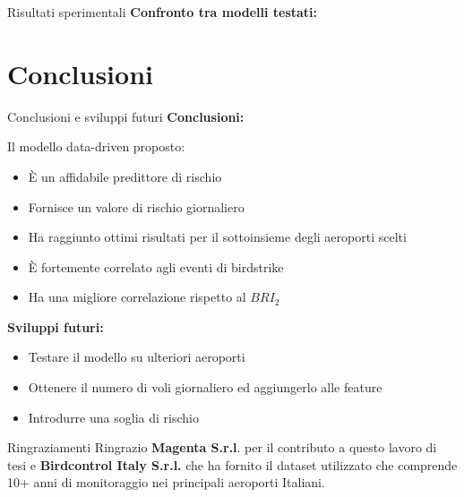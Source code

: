 \documentclass[10pt]{beamer}
\begin{document}
\begin{frame}{Risultati sperimentali}
\textbf{Confronto tra modelli testati:}
\begin{figure}
	\centering
	\par
\end{figure}
\end{frame}

\section{Conclusioni}
\begin{frame}{Conclusioni e sviluppi futuri}
\textbf{Conclusioni:}\par
Il modello data-driven proposto:
\begin{itemize}
    \item \`E un affidabile predittore di rischio
    \item Fornisce un valore di rischio giornaliero
    \item Ha raggiunto ottimi risultati per il sottoinsieme degli aeroporti scelti
    \item\`E fortemente correlato agli eventi di birdstrike
    \item Ha una migliore correlazione rispetto al $BRI_2$
\end{itemize}

\textbf{Sviluppi futuri:}
\begin{itemize}
    \item Testare il modello su ulteriori aeroporti 
    \item Ottenere il numero di voli giornaliero ed aggiungerlo alle feature
    \item Introdurre una soglia di rischio
\end{itemize}
\end{frame}

\begin{frame}{Ringraziamenti}
Ringrazio \textbf{Magenta S.r.l}. per il contributo a questo lavoro di tesi e \textbf{Birdcontrol Italy S.r.l.} che ha fornito il dataset utilizzato che comprende 10+ anni di monitoraggio nei principali aeroporti Italiani.
\end{frame}

\maketitle
\end{document}
